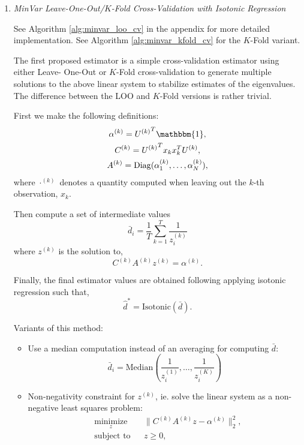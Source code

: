 \documentclass{article}
\begin{document}
\begin{enumerate}

\item \emph{MinVar Leave-One-Out/$K$-Fold Cross-Validation with Isotonic
Regression}

See Algorithm \ref{alg:minvar_loo_cv} in the appendix for more detailed
implementation.  See Algorithm \ref{alg:minvar_kfold_cv} for the $K$-Fold
variant.

The first proposed estimator is a simple cross-validation estimator using either
Leave- One-Out or $K$-Fold cross-validation to generate multiple solutions to
the above linear system to stabilize estimates of the eigenvalues.  The
difference between the LOO and $K$-Fold versions is rather trivial.

First we make the following definitions:
\begin{gather*} 
	\alpha^{(k)} = {U^{(k)}}^T\mathbbm{1}, \\ 
	C^{(k)} = {U^{(k)}}^T x_k x_k^T U^{(k)}, \\
	A^{(k)} = \mathrm{Diag}(\alpha^{(k)}_1, \ldots, \alpha^{(k)}_N),
\end{gather*}
where $\cdot^{(k)}$ denotes a quantity computed when leaving out the $k$-th
observation, $x_k$.

Then compute a set of intermediate values 
$$
	\bar{d}_i = \frac1T \sum_{k=1}^T \frac{1}{z_i^{(k)}}
$$
where $z^{(k)}$ is the solution to,
$$
	C^{(k)} A^{(k)} z^{(k)} = \alpha^{(k)}.
$$

Finally, the final estimator values are obtained following applying isotonic
regression such that,
$$
	\hat{d}^* = \mathrm{Isotonic}(\bar{d}).
$$


Variants of this method:
\begin{itemize}
	\item Use a median computation instead of an averaging for computing
	$\bar{d}$:
	$$
		\bar{d}_i = \mathrm{Median}\left(
				\frac{1}{z_i^{(1)}}, \ldots, \frac{1}{z_i^{(K)}}\right)
	$$	
	\item Non-negativity constraint for $z^{(k)}$, ie. solve the linear system
	as a non-negative least squares problem:
	\begin{equation*}
	  \begin{aligned}
	    & \underset{z}{\text{minimize}}
	    & & \| C^{(k)} A^{(k)} z - \alpha^{(k)} \|_2^2, \\
	    & \text{subject to}
	    & & z \geq 0,
	  \end{aligned}
	\end{equation*}


\end{itemize}
\end{enumerate}
\end{document}
